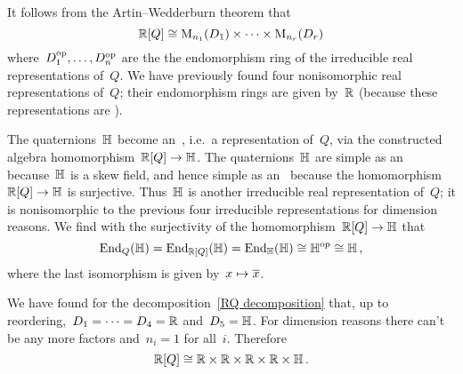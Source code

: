 It follows from the Artin--Wedderburn theorem that
\begin{equation}
  \label{RQ decomposition}
  \mathbb{R}[Q]
  \cong
  \operatorname{M}_{n_1}(D_1) \times \dotsb \times \operatorname{M}_{n_r}(D_r)
\end{equation}
where~$D_1^{\mathrm{op}}, \dotsc, D_n^{\mathrm{op}}$ are the the endomorphism ring of the irreducible real representations of~$Q$.
We have previously found four nonisomorphic  real representations of~$Q$;
their endomorphism rings are given by~$\mathbb{R}$ (because these representations are ).

The quaternions~$\Quaternion$ become an~\module{$\Real[Q]$}, i.e.\ a representation of~$Q$, via the constructed algebra homomorphism~$\mathbb{R}[Q] \to \mathbb{H}$.
The quaternions~$\Quaternion$ are simple as an~\module{$\Quaternion$} because~$\Quaternion$ is a skew field, and hence simple as an~\module{$\Real[Q]$} because the homomorphism~$\mathbb{R}[Q] \to \mathbb{H}$ is surjective.
Thus~$\Quaternion$ is another irreducible real representation of~$Q$;
it is nonisomorphic to the previous four irreducible representations for dimension reasons.
We find with the surjectivity of the homomorphism~$\mathbb{R}[Q] \to \mathbb{H}$ that
\[
  \operatorname{End}_Q(\mathbb{H})
  =
  \operatorname{End}_{\mathbb{R}[Q]}(\mathbb{H})
  =
  \operatorname{End}_{\mathbb{H}}(\mathbb{H})
  \cong
  \mathbb{H}^{\mathrm{op}}
  \cong
  \mathbb{H} \,,
\]
where the last isomorphism is given by~$x \mapsto \overline{x}$.

We have found for the decomposition~\eqref{RQ decomposition} that, up to reordering,~$D_1 = \dotsb = D_4 = \mathbb{R}$ and~$D_5 = \mathbb{H}$.
For dimension reasons there can’t be any more factors and~$n_i = 1$ for all~$i$.
Therefore
\[
  \mathbb{R}[Q]
  \cong
  \mathbb{R} \times \mathbb{R} \times \mathbb{R} \times \mathbb{R} \times \mathbb{H} \,.
\]


